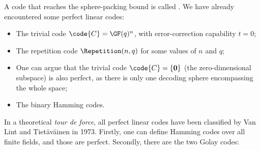 \documentclass[a4paper, 11pt, openany]{book}
\begin{document}
A code that reaches the sphere-packing bound is called . We have already encountered some perfect linear codes:
\begin{itemize}
    \item The trivial code $\code{C} = \GF(q)^n$, with error-correction capability $t = 0$;

    \item The repetition code $\Repetition(n,q)$ for some values of $n$ and $q$;

    \item One can argue that the trivial code $\code{C} = \{ {\bf 0} \}$ (the zero-dimensional subspace) is also perfect, as there is only one decoding sphere encompassing the whole space;

    \item The binary Hamming codes.
\end{itemize}
In a theoretical \textit{tour de force}, all perfect linear codes have been classified by Van Lint and Tiet\"av\"ainen in 1973. Firstly, one can define Hamming codes over all finite fields, and those are perfect. Secondly, there are the two Golay codes:
\end{document}
